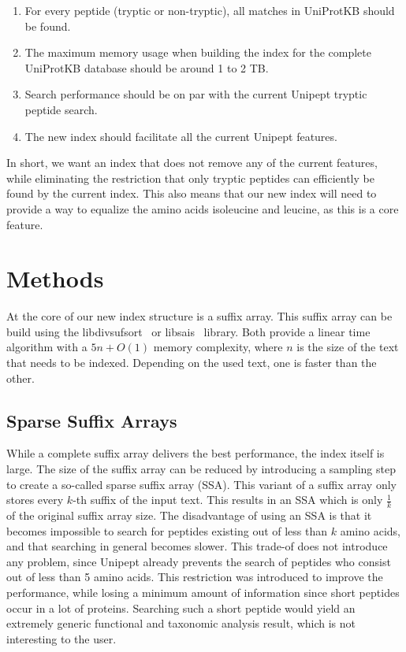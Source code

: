 \documentclass[11pt]{article}
\begin{document}
\begin{multicols}{2}
        \begin{enumerate}
            \item For every peptide (tryptic or non-tryptic), all matches in UniProtKB should be found.
            \item The maximum memory usage when building the index for the complete UniProtKB database should be around 1 to 2 TB\@.
            \item Search performance should be on par with the current Unipept tryptic peptide search.
            \item The new index should facilitate all the current Unipept features.
        \end{enumerate}

        In short, we want an index that does not remove any of the current features, while eliminating the restriction that only tryptic peptides can efficiently be found by the current index.
        This also means that our new index will need to provide a way to equalize the amino acids isoleucine and leucine, as this is a core feature.


        \section{Methods}\label{sec:methods}
        At the core of our new index structure is a suffix array.
        This suffix array can be build using the libdivsufsort~\cite{libdivsufsort} or libsais~\cite{libsais} library.
        Both provide a linear time algorithm with a $5n + O(1)$ memory complexity, where $n$ is the size of the text that needs to be indexed.
        Depending on the used text, one is faster than the other.

        \subsection{Sparse Suffix Arrays}
        While a complete suffix array delivers the best performance, the index itself is large.
        The size of the suffix array can be reduced by introducing a sampling step to create a so-called sparse suffix array (SSA).
        This variant of a suffix array only stores every $k$-th suffix of the input text.
        This results in an SSA which is only $\frac{1}{k}$ of the original suffix array size.
        The disadvantage of using an SSA is that it becomes impossible to search for peptides existing out of less than $k$ amino acids, and that searching in general becomes slower.
        This trade-of does not introduce any problem, since Unipept already prevents the search of peptides who consist out of less than 5 amino acids.
        This restriction was introduced to improve the performance, while losing a minimum amount of information since short peptides occur in a lot of proteins.
        Searching such a short peptide would yield an extremely generic functional and taxonomic analysis result, which is not interesting to the user.


\end{multicols}
\end{document}
